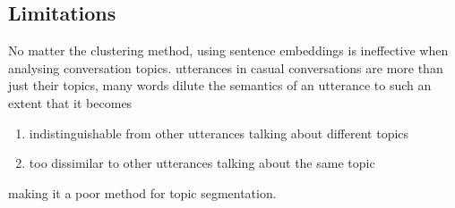     \subsection{Limitations}
        No matter the clustering method, using sentence \glspl{embedding} is ineffective when analysing conversation topics. \Glspl{utterance} in casual conversations are more than just their topics, many words dilute the semantics of an \gls{utterance} to such an extent that it becomes
        \begin{enumerate}
            \item indistinguishable from other \glspl{utterance} talking about different topics
            \item too dissimilar to other \glspl{utterance} talking about the same topic
        \end{enumerate}
        making it a poor method for topic segmentation.








